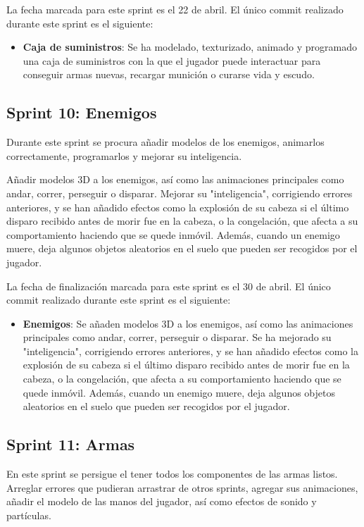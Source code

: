 La fecha marcada para este sprint es el 22 de abril. El único commit realizado durante este sprint es el siguiente:
\begin{itemize}
    \item \textbf{Caja de suministros}: Se ha modelado, texturizado, animado y programado una caja de suministros con la que el jugador puede interactuar para conseguir armas nuevas, recargar munición o curarse vida y escudo.
\end{itemize}
\subsection{Sprint 10: Enemigos}
Durante este sprint se procura añadir modelos de los enemigos, animarlos correctamente, programarlos y mejorar su inteligencia.

Añadir modelos 3D a los enemigos, así como las animaciones principales como andar, correr, perseguir o disparar. Mejorar su "inteligencia", corrigiendo errores anteriores, y se han añadido efectos como la explosión de su cabeza si el último disparo recibido antes de morir fue en la cabeza, o la congelación, que afecta a su comportamiento haciendo que se quede inmóvil. Además, cuando un enemigo muere, deja algunos objetos aleatorios en el suelo que pueden ser recogidos por el jugador.

La fecha de finalización marcada para este sprint es el 30 de abril. El único commit realizado durante este sprint es el siguiente:
\begin{itemize}
    \item \textbf{Enemigos}: Se añaden modelos 3D a los enemigos, así como las animaciones principales como andar, correr, perseguir o disparar. Se ha mejorado su "inteligencia", corrigiendo errores anteriores, y se han añadido efectos como la explosión de su cabeza si el último disparo recibido antes de morir fue en la cabeza, o la congelación, que afecta a su comportamiento haciendo que se quede inmóvil. Además, cuando un enemigo muere, deja algunos objetos aleatorios en el suelo que pueden ser recogidos por el jugador.
\end{itemize}
\subsection{Sprint 11: Armas}
En este sprint se persigue el tener todos los componentes de las armas listos. Arreglar errores que pudieran arrastrar de otros sprints, agregar sus animaciones, añadir el modelo de las manos del jugador, así como efectos de sonido y partículas.

